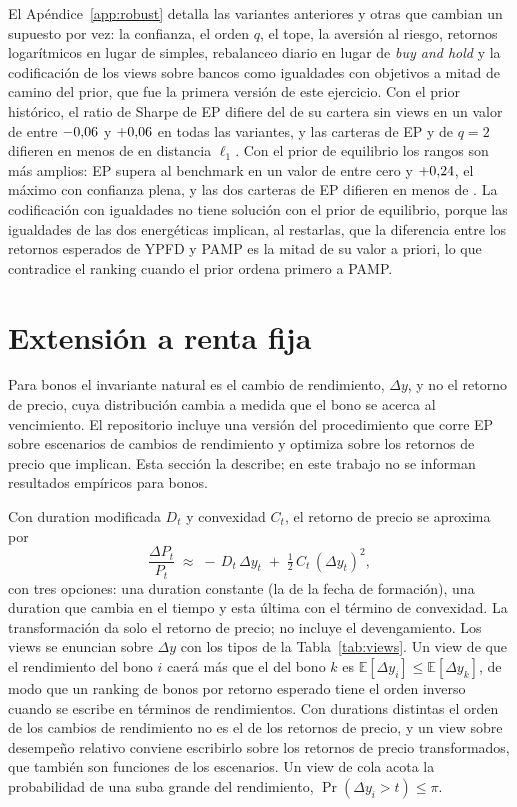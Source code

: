 \documentclass[11pt]{article}
\newcommand{\E}{\mathbb{E}}
\begin{document}
El Ap\'endice~\ref{app:robust} detalla las variantes anteriores y otras que cambian
un supuesto por vez: la confianza, el orden $q$, el tope, la aversi\'on al
riesgo, retornos logar\'itmicos en lugar de simples, rebalanceo diario en
lugar de \emph{buy and hold} y la codificaci\'on de los views sobre bancos
como igualdades con objetivos a mitad de camino del prior, que fue la
primera versi\'on de este ejercicio. Con el prior hist\'orico, el ratio de
Sharpe de EP difiere del de su cartera sin views en un valor de entre
$-0{,}06$ y $+0{,}06$ en todas las variantes, y las carteras de EP y de
$q=2$ difieren en menos de \nRobQmax{} en distancia $\ell_1$. Con el prior
de equilibrio los rangos son m\'as amplios: EP supera al benchmark en un
valor de entre cero y $+0{,}24$, el m\'aximo con confianza plena, y las
dos carteras de EP difieren en menos de \nRobQmaxEq. La codificaci\'on con igualdades no tiene soluci\'on
con el prior de equilibrio, porque las igualdades de las dos energ\'eticas implican, al
restarlas, que la diferencia entre los retornos esperados de YPFD y PAMP
es la mitad de su valor a priori, lo que
contradice el ranking cuando el prior ordena primero a PAMP.

\section{Extensi\'on a renta fija}\label{sec:bonds}

Para bonos el invariante natural es el cambio de rendimiento, $\Delta y$,
y no el retorno de precio, cuya distribuci\'on cambia a medida que el bono se
acerca al vencimiento. El repositorio incluye una versi\'on del
procedimiento que corre EP sobre escenarios de cambios de rendimiento y
optimiza sobre los retornos de precio que implican. Esta secci\'on la
describe; en este trabajo no se informan resultados emp\'iricos para bonos.

Con duration modificada $D_t$ y convexidad $C_t$, el retorno de precio se
aproxima por
\begin{equation}\label{eq:duration}
\frac{\Delta P_t}{P_{t}} \;\approx\; -\,D_{t}\,\Delta y_t \;+\; \tfrac{1}{2}\,C_{t}\,(\Delta y_t)^2,
\end{equation}
con tres opciones: una duration constante (la de la fecha de formaci\'on),
una duration que cambia en el tiempo y esta \'ultima con el t\'ermino de
convexidad. La transformaci\'on da solo el retorno de precio; no incluye el
devengamiento. Los views se enuncian sobre $\Delta y$ con los tipos de la
Tabla~\ref{tab:views}. Un view de que el rendimiento del bono $i$ caer\'a m\'as que el del bono
$k$ es $\E[\Delta y_i] \le \E[\Delta y_k]$, de modo que un ranking de bonos
por retorno esperado tiene el orden inverso cuando se escribe en t\'erminos
de rendimientos. Con durations distintas el orden de los cambios de
rendimiento no es el de los retornos de precio, y un view sobre desempe\~no
relativo conviene escribirlo sobre los retornos de precio transformados,
que tambi\'en son funciones de los escenarios. Un view de
cola acota la probabilidad de una suba grande del rendimiento,
$\Pr(\Delta y_i > t) \le \pi$.
\end{document}
